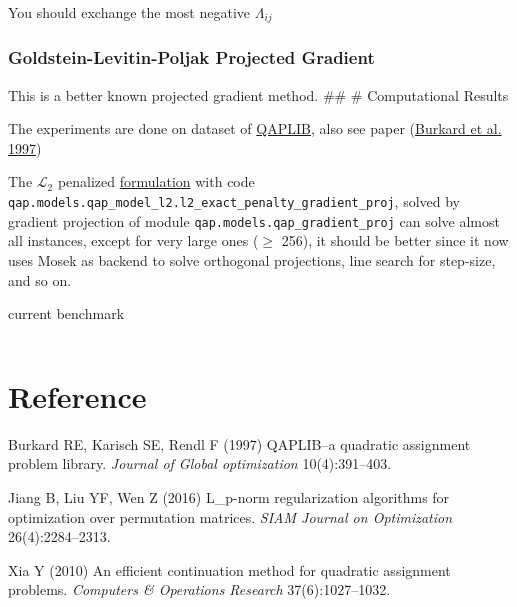 \documentclass[
  10pt,
  a4paper,
,tablecaptionabove
]{scrartcl}
\begin{document}
You should exchange the most negative \(\Lambda_{ij}\)

\hypertarget{goldstein-levitin-poljak-projected-gradient}{%
\subsubsection{Goldstein-Levitin-Poljak Projected
Gradient}\label{goldstein-levitin-poljak-projected-gradient}}

This is a better known projected gradient method. \#\# \# Computational
Results

The experiments are done on dataset of
\href{http://anjos.mgi.polymtl.ca/qaplib/}{QAPLIB}, also see paper
(\protect\hyperlink{ref-burkard1997qaplib}{Burkard et al. 1997})

The \(\mathscr L_2\) penalized
\protect\hyperlink{mathscr-l_2--mathscr-l_1-penalized-formulation}{formulation}
with code
\texttt{qap.models.qap\_model\_l2.l2\_exact\_penalty\_gradient\_proj},
solved by gradient projection of module
\texttt{qap.models.qap\_gradient\_proj} can solve almost all instances,
except for very large ones (\(\ge\) 256), it should be better since it
now uses Mosek as backend to solve orthogonal projections, line search
for step-size, and so on.

current benchmark

\begin{verbatim}
\end{verbatim}

\hypertarget{reference}{%
\section*{Reference}\label{reference}}

\hypertarget{refs}{}
\begin{CSLReferences}{1}{0}
\leavevmode\hypertarget{ref-burkard1997qaplib}{}%
Burkard RE, Karisch SE, Rendl F (1997) QAPLIB--a quadratic assignment
problem library. \emph{Journal of Global optimization} 10(4):391--403.

\leavevmode\hypertarget{ref-jiang_l_p-norm_2016}{}%
Jiang B, Liu YF, Wen Z (2016) L\_p-norm regularization algorithms for
optimization over permutation matrices. \emph{{SIAM} Journal on
Optimization} 26(4):2284--2313.

\leavevmode\hypertarget{ref-xia_efficient_2010}{}%
Xia Y (2010) An efficient continuation method for quadratic assignment
problems. \emph{Computers \& Operations Research} 37(6):1027--1032.

\end{CSLReferences}
\end{document}
